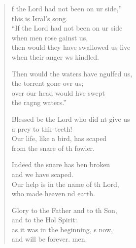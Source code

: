 \begin{verse}
  \begin{patverse}
f the Lord had not been on ur side,”\Med\\
this is Isral’s song.\\
“If the Lord had not been on ur side\Med\\
when men rose gainst us,\\
then would they have swallowed us live\Med\\
when their anger ws kindled.

Then would the waters have ngulfed us,\Med\\
the torrent gone ovr us;\\
over our head would hve swept\Med\\
the rag\pointup{\i}ng waters.”

Blessed be the Lord who did nt give us\Med\\
a prey to thir teeth!\\
Our life, like a bird, has scaped\Med\\
from the snare of th fowler.

Indeed the snare has ben broken\Med\\
and we have scaped.\\
Our help is in the name of th Lord,\Med\\
who made heaven nd earth.

Glory to the Father and to th Son,\Med\\
and to the Hol Spirit:\\
as it was in the beginning, \pointup{\i}s now,\Med\\
and will be forever. men. 
  \end{patverse}
\end{verse}
